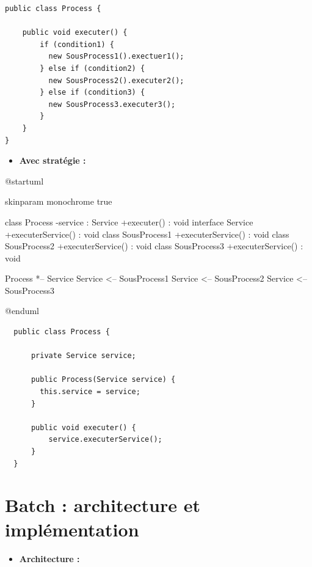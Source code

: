 \documentclass[a4paper, 12pt]{report}
\begin{document}
\begin{lstlisting}
public class Process {

    public void executer() {
        if (condition1) {
          new SousProcess1().exectuer1();
        } else if (condition2) {
          new SousProcess2().executer2();
        } else if (condition3) {
          new SousProcess3.executer3();
        }
    }    
}
\end{lstlisting}
\clearpage

\begin{itemize}
  \item \textbf{Avec stratégie :}\\
\end{itemize}

\begin{center}
  \begin{plantuml}
    @startuml

    skinparam monochrome true

    class Process {
      -service : Service
      +executer() : void
    }
    interface Service {
      +executerService() : void
    }
    class SousProcess1 {
      +executerService() : void
    }
    class SousProcess2 {
      +executerService() : void
    }
    class SousProcess3 {
      +executerService() : void
    }

    Process *-- Service
    Service <-- SousProcess1
    Service <-- SousProcess2
    Service <-- SousProcess3

    @enduml
  \end{plantuml}
\end{center}
\vspace{0.5cm}

\begin{lstlisting}
  public class Process {

      private Service service;

      public Process(Service service) {
        this.service = service;
      }
  
      public void executer() {
          service.executerService();
      }    
  }
  \end{lstlisting}

\chapter{Batch : architecture et implémentation}
\label{appendix:batch}

\begin{itemize}
  \item \textbf{Architecture :}\\
\end{itemize}
\end{document}
